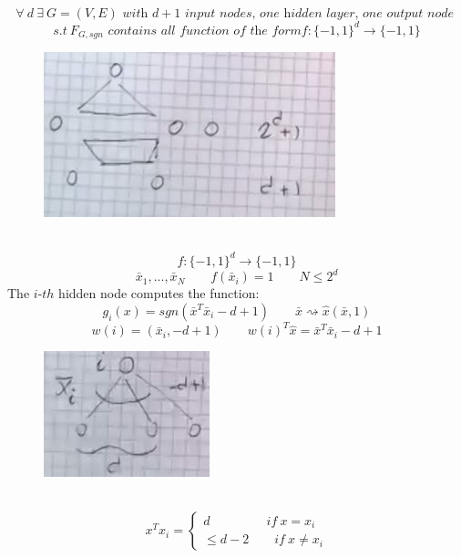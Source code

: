 \documentclass[../main.tex]{subfiles}
\begin{document}
$$
\forall \ d \ \exists \ G = (V,E) \textit{\ with $d+1$ input nodes, one hidden layer, one output node }
$$
$$ s.t \ F_{G,sgn} \textit{ contains all function of the form} f:\{-1,1\}^d \rightarrow \{-1,1\}
$$

\begin{figure}[h]
    \centering
    \includegraphics[width=0.5\linewidth]{../img/lez24-img11.JPG}
    \caption{}
\end{figure}\\
$$
f: \{-1,1\}^d \rightarrow \{-1,1\}
$$
$$
\bar{x}_1,...,\bar{x}_N \qquad f(\bar{x}_i) = 1 \qquad N \leq 2^d
$$
The $i$-$th$ hidden node computes the function: $$g_i(x) = sgn(\bar{x}^T \bar{x}_i - d +1) \qquad \bar{x} \rightsquigarrow \hat{x}(\bar{x},1) 
$$
$$
w(i) = (\bar{x}_i, -d+1) \qquad 
w(i)^T \hat{x} = \bar{x}^T \bar{x}_i -d +1
$$
\begin{figure}[h]
    \centering
    \includegraphics[width=0.3\linewidth]{../img/lez24-img12.JPG}
    \caption{}
\end{figure}\\
$$
x^T x_i = \begin{cases}
d \qquad \qquad \ \ if \ x=x_i
\\
\leq d-2 \qquad if \ x \neq x_i
\end{cases}
$$
\end{document}
